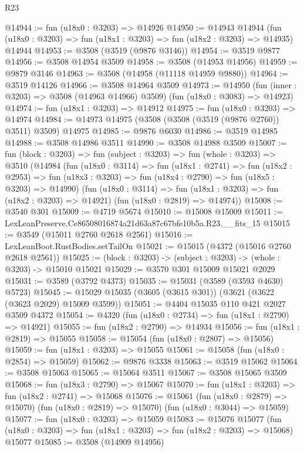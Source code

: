 \begin{lexlean}{R23}
\begin{coremodule}
@14944 := fun (u18x0 : @3203) => @14926
@14950 := @14943
    @14944
    (fun (u18x0 : @3203) => fun (u18x1 : @3203) => fun (u18x2 : @3203) => @14935)
    @14944
@14953 := @3508 (@3519 (@9876 @3146))
@14954 := @3519 @9877
@14956 := @3508 @14954 @3509
@14958 := @3508 (@14953 @14956)
@14959 := @9879 @3146
@14963 := @3508 (@14958 (@11118 @14959 @9880))
@14964 := @3519 @14126
@14966 := @3508 @14964 @3509
@14973 := @14950
    (fun (inner : @3203) => @3508 (@14963 @14966) @3509)
    (fun (u18x0 : @3083) => @14923)
@14974 := fun (u18x1 : @3203) => @14912
@14975 := fun (u18x0 : @3203) => @14974
@14984 := @14973 @14975 (@3508 (@3508 (@3519 (@9876 @2760)) @3511) @3509) @14975
@14985 := @9876 @6030
@14986 := @3519 @14985
@14988 := @3508 @14986 @3511
@14990 := @3508 @14988 @3509
@15007 := fun (block : @3203) =>
  fun (subject : @3203) =>
  fun (whole : @3203) =>
  @3510
    (@14984
      (fun (u18x0 : @3114) =>
      fun (u18x1 : @2741) =>
      fun (u18x2 : @2953) =>
      fun (u18x3 : @3203) => fun (u18x4 : @2790) => fun (u18x5 : @3203) => @14990)
      (fun (u18x0 : @3114) => fun (u18x1 : @3203) => fun (u18x2 : @3203) => @14921)
      (fun (u18x0 : @2819) => @14974))
@15008 := @3540 @301
@15009 := @4719 @5674
@15010 := @15008 @15009
@15011 := LexLeanPreserve.Ce86508016874a21d63a87c67bfe10b5a.R23.__fits_15
@15015 := @3549 (@15011 @2760 @2618 @2561)
@15016 := LexLeanBoot.RustBodies.setTailOn
@15021 := @15015 (@4372 (@15016 @2760 @2618 @2561))
@15025 := (block : @3203) -> (subject : @3203) -> (whole : @3203) -> @15010 @15021
@15029 := @3570 @301 @15009 @15021 @2029
@15031 := @3589 (@3792 @4373)
@15035 := @15031 (@3589 (@3593 @4630) @5723)
@15045 := @15029 @15035 (@3605 (@3615 @301)) (@3621 (@3622 (@3623 @2029) @15009 @3599))
@15051 := @4404 @15035 @110 @421 @2027 @3509 @4372
@15054 := @4320 (fun (u18x0 : @2734) => fun (u18x1 : @2790) => @14921)
@15055 := fun (u18x2 : @2790) => @14934
@15056 := fun (u18x1 : @2819) => @15055
@15058 := @15054 (fun (u18x0 : @2807) => @15056)
@15059 := fun (u18x1 : @3203) => @15055
@15061 := @15058 (fun (u18x0 : @2854) => @15059)
@15062 := @9876 @3338
@15063 := @3519 @15062
@15064 := @3508 @15063
@15065 := @15064 @3511
@15067 := @3508 @15065 @3509
@15068 := fun (u18x3 : @2790) => @15067
@15070 := fun (u18x1 : @3203) => fun (u18x2 : @2741) => @15068
@15076 := @15061
    (fun (u18x0 : @2879) => @15070)
    (fun (u18x0 : @2819) => @15070)
    (fun (u18x0 : @3044) => @15059)
@15077 := fun (u18x0 : @3203) => @15059
@15083 := @15076
    @15077
    (fun (u18x0 : @3203) => fun (u18x1 : @3203) => fun (u18x2 : @3203) => @15068)
    @15077
@15085 := @3508 (@14909 @14956)

\end{coremodule}
\end{lexlean}
